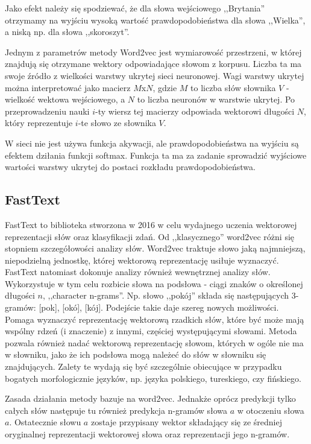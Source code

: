 \documentclass[pl]{minipw} %
\begin{document}
Jako efekt należy się spodziewać, że dla słowa wejściowego ,,Brytania'' otrzymamy na wyjściu wysoką wartość prawdopodobieństwa dla słowa ,,Wielka'', a niską np. dla słowa ,,skoroszyt''.

Jednym z parametrów metody Word2vec jest wymiarowość przestrzeni, w której znajdują się otrzymane wektory odpowiadające słowom z korpusu. Liczba ta ma swoje źródło z wielkości warstwy ukrytej sieci neuronowej. Wagi warstwy ukrytej można interpretować jako macierz $M$x$N$, gdzie $M$ to liczba słów słownika $V$ - wielkość wektowa wejściowego, a $N$ to liczba neuronów w warstwie ukrytej. Po przeprowadzeniu nauki $i$-ty wiersz tej macierzy odpowiada wektorowi długości $N$, który reprezentuje $i$-te słowo ze słownika $V$.

W sieci nie jest używa funkcja akywacji, ale prawdopodobieństwa na wyjściu są efektem dziłania funkcji softmax. Funkcja ta ma za zadanie sprowadzić wyjściowe wartości warstwy ukrytej do postaci rozkładu prawdopodobieństwa. 


\subsection{FastText}

FastText\cite{fasttext} to biblioteka stworzona w 2016 w celu wydajnego uczenia wektorowej reprezentacji słów oraz klasyfikacji zdań. Od ,,klasycznego'' word2vec różni się stopniem szczegółowości analizy słów. Word2vec traktuje słowo jaką najmniejszą, niepodzielną jednostkę, której wektorową reprezentację usiłuje wyznaczyć. FastText natomiast dokonuje analizy również wewnętrznej analizy słów. Wykorzystuje w tym celu rozbicie słowa na podsłowa - ciągi znaków o określonej długości $n$, ,,character n-grams''. Np. słowo ,,pokój'' składa się następujących 3-gramów: [pok], [okó], [kój]. Podejście takie daje szereg nowych możliwości. Pomaga wyznaczyć reprezentację wektorową rzadkich słów, które być może mają wspólny rdzeń (i znaczenie) z innymi, częściej występującymi słowami. Metoda pozwala również nadać wektorową reprezentację słowom, których w ogóle nie ma w słowniku, jako że ich podsłowa mogą należeć do słów w słowniku się znajdujących. Zalety te wydają się być szczególnie obiecujące w przypadku bogatych morfologicznie języków, np. języka polskiego, tureskiego, czy fińskiego.

Zasada działania metody bazuje na word2vec. Jednakże oprócz predykcji tylko całych słów następuje tu również predykcja n-gramów słowa $a$ w otoczeniu słowa $a$. Ostatecznie słowu $a$ zostaje przypisany wektor składający się ze średniej oryginalnej reprezentacji wektorowej słowa oraz reprezentacji jego n-gramów.
\end{document}
